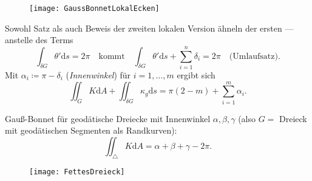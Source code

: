 \begin{figure}[H]
  \texttt{[image: GaussBonnetLokalEcken]}
\end{figure}

Sowohl Satz als auch Beweis der zweiten lokalen Version ähneln der ersten --- anstelle des Terms
\begin{equation*}
  \int_{\delta G}\theta'\text{d}s = 2\pi \quad \text{kommt} \quad  \int_{\delta G}\theta'\text{d}s + \sum_{i = 1}^n\delta_i = 2\pi \quad \text{(Umlaufsatz).}
\end{equation*}
Mit \( \alpha_i \coloneqq \pi - \delta_i \) (\emph{Innenwinkel}) für \( i = 1,\dots,m \) ergibt sich
\begin{equation*}
  \iint_G K\text{d}A + \iint_{\delta G}\kappa_g\text{d}s = \pi(2-m) + \sum_{i = 1}^m\alpha_i\text{.}
\end{equation*}


\begin{minipage}{.675\textwidth}
  \begin{remark}[Spezialfall]
    Gauß-Bonnet für geodätische Dreiecke mit Innenwinkel \( \alpha,\beta,\gamma \) (also \( G = \) Dreieck mit geodätischen Segmenten als Randkurven):
    \begin{equation*}
      \iint_\triangle K\text{d}A = \alpha + \beta + \gamma -2\pi\text{.}
    \end{equation*}
  \end{remark}  
\end{minipage}
\hfill
\begin{minipage}{.3\textwidth}
  \begin{figure}[H]
    \texttt{[image: FettesDreieck]}
  \end{figure}
\end{minipage}

